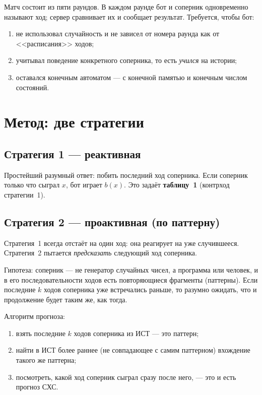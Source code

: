 \documentclass[a4paper,14pt]{extarticle}
\begin{document}
Матч состоит из пяти раундов. В каждом раунде бот и соперник одновременно
называют ход; сервер сравнивает их и сообщает результат. Требуется, чтобы бот:

\begin{enumerate}
\item не использовал случайность и не зависел от номера раунда как от
      <<расписания>> ходов;
\item учитывал поведение конкретного соперника, то есть \emph{учился} на
      истории;
\item оставался конечным автоматом --- с конечной памятью и конечным числом
      состояний.
\end{enumerate}

\section{Метод: две стратегии}

\subsection{Стратегия 1 --- реактивная}

Простейший разумный ответ: побить последний ход соперника. Если соперник
только что сыграл $x$, бот играет $b(x)$. Это задаёт \textbf{таблицу~1}
(контрход стратегии~1).

\subsection{Стратегия 2 --- проактивная (по паттерну)}

Стратегия~1 всегда отстаёт на один ход: она реагирует на уже случившееся.
Стратегия~2 пытается \emph{предсказать} следующий ход соперника.

Гипотеза: соперник --- не генератор случайных чисел, а программа или человек,
и в его последовательности ходов есть повторяющиеся фрагменты (паттерны).
Если последние $k$ ходов соперника уже встречались раньше, то разумно ожидать,
что и продолжение будет таким же, как тогда.

Алгоритм прогноза:
\begin{enumerate}
\item взять последние $k$ ходов соперника из ИСТ --- это паттерн;
\item найти в ИСТ более раннее (не совпадающее с самим паттерном) вхождение
      такого же паттерна;
\item посмотреть, какой ход соперник сыграл сразу после него, --- это и есть
      прогноз СХС.
\end{enumerate}
\end{document}
